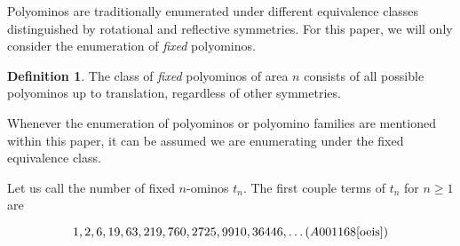 \documentclass[12pt]{article}
\theoremstyle{plain}
\theoremstyle{definition}
\theoremstyle{remark}
\theoremstyle{definition}
\newtheorem{definition}{Definition}[section]
\begin{document}
Polyominos are traditionally enumerated under different equivalence classes distinguished by rotational and reflective symmetries. For this paper, we will only consider the enumeration of \textit{fixed} polyominos. 

\begin{definition}\label{def:fixedpolyominos}
The class of \textit{fixed} polyominos of area $n$ consists of all possible polyominos up to translation, regardless of other symmetries.
\end{definition}

Whenever the enumeration of polyominos or polyomino families are mentioned within this paper, it can be assumed we are enumerating under the fixed equivalence class. 

Let us call the number of fixed $n$-ominos $t_n$. The first couple terms of $t_n$ for $n \geq 1$ are 

$$1,2,6,19,63,219,760,2725,9910,36446,\dots (A001168 \text{\cite{oeis}})$$
\end{document}
